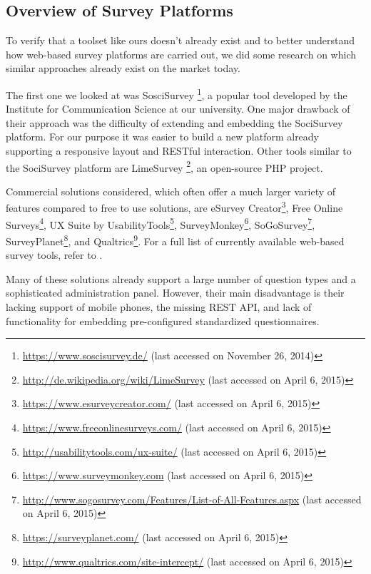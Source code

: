 





	\subsection{Overview of Survey Platforms}
	To verify that a toolset like ours doesn't already exist and to better understand how web-based survey platforms are carried out, we did some research on which similar approaches already exist on the market today.

	The first one we looked at was SosciSurvey \footnote{\url{https://www.soscisurvey.de/} (last accessed on November 26, 2014)}, a popular tool developed by the Institute for Communication Science at our university. One major drawback of their approach was the difficulty of extending and embedding the SociSurvey platform. For our purpose it was easier to build a new platform already supporting a responsive layout and RESTful interaction. Other tools similar to the SociSurvey platform are LimeSurvey \footnote{\url{http://de.wikipedia.org/wiki/LimeSurvey} (last accessed on April 6, 2015)}, an open-source PHP project.

	Commercial solutions considered, which often offer a much larger variety of features compared to free to use solutions, are eSurvey Creator\footnote{\url{https://www.esurveycreator.com/} (last accessed on April 6, 2015)}, Free Online Surveys\footnote{\url{https://www.freeonlinesurveys.com/} (last accessed on April 6, 2015)}, UX Suite by UsabilityTools\footnote{\url{http://usabilitytools.com/ux-suite/} (last accessed on April 6, 2015)}, SurveyMonkey\footnote{\url{https://www.surveymonkey.com} (last accessed on April 6, 2015)}, SoGoSurvey\footnote{\url{http://www.sogosurvey.com/Features/List-of-All-Features.aspx} (last accessed on April 6, 2015)}, SurveyPlanet\footnote{\url{https://surveyplanet.com/} (last accessed on April 6, 2015)}, and Qualtrics\footnote{\url{http://www.qualtrics.com/site-intercept/} (last accessed on April 6, 2015)}. For a full list of currently available web-based survey tools, refer to \cite{Capterra2015SurveyTools, Idealware2011SurveyTools}.

	Many of these solutions already support a large number of question types and a sophisticated administration panel. However, their main disadvantage is their lacking support of mobile phones, the missing REST API, and lack of functionality for embedding pre-configured standardized questionnaires. %

